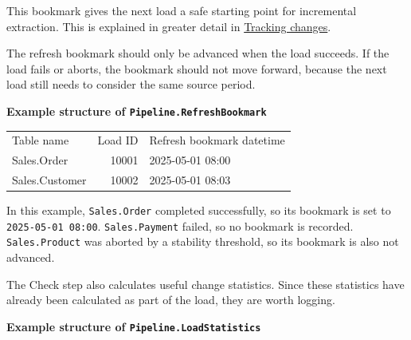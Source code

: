 \documentclass[10pt,openany,10pt]{book}
\newcounter{none}
\let\podeToprule\toprule
\let\podeMidrule\midrule
\let\podeBottomrule\bottomrule
\renewcommand{\toprule}{\arrayrulecolor{pbiGrid}\podeToprule}
\renewcommand{\midrule}{\arrayrulecolor{pbiGrid}\podeMidrule}
\renewcommand{\bottomrule}{\arrayrulecolor{pbiGrid}\podeBottomrule}
\begin{document}
This bookmark gives the next load a safe starting point for incremental
extraction. This is explained in greater detail in
\hyperref[docs-efficient-stable-pipeline-tracking-changes]{Tracking
changes}.

The refresh bookmark should only be advanced when the load succeeds. If
the load fails or aborts, the bookmark should not move forward, because
the next load still needs to consider the same source period.

\textbf{Example structure of \texttt{Pipeline.RefreshBookmark}}

{\def\LTcaptype{none} %
\begin{longtable}[]{@{}lrl@{}}
\toprule\noalign{}
Table name & Load ID & Refresh bookmark datetime \\
\midrule\noalign{}
\endhead
\bottomrule\noalign{}
\endlastfoot
Sales.Order & 10001 & 2025-05-01 08:00 \\
Sales.Customer & 10002 & 2025-05-01 08:03 \\
\end{longtable}
}

In this example, \texttt{Sales.Order} completed successfully, so its
bookmark is set to \texttt{2025-05-01\ 08:00}. \texttt{Sales.Payment}
failed, so no bookmark is recorded. \texttt{Sales.Product} was aborted
by a stability threshold, so its bookmark is also not advanced.

The Check step also calculates useful change statistics. Since these
statistics have already been calculated as part of the load, they are
worth logging.

\textbf{Example structure of \texttt{Pipeline.LoadStatistics}}
\end{document}
